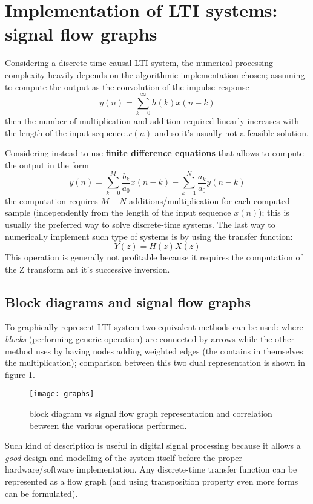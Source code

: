 \section{Implementation of LTI systems: signal flow graphs}
	Considering a discrete-time causal LTI system, the numerical processing complexity heavily depends on the algorithmic implementation chosen; assuming to compute the output as the convolution of the impulse response
	\[  y(n) = \sum_{k=0}^\infty h(k) x(n-k)  \]
	then the number of multiplication and addition required linearly increases with the length of the input sequence $x(n)$ and so it's usually not a feasible solution.
	
	Considering instead to use \textbf{finite difference equations} that allows to compute the output in the form
	\begin{equation}
		y(n) = \sum_{k=0}^M \frac{b_k}{a_0} x(n-k) - \sum_{k=1}^N \frac{a_k}{a_0} y(n-k)
	\end{equation}
	the computation requires $M+N$ additions/multiplication for each computed sample (independently from the length of the input sequence $x(n)$); this is usually the preferred way to solve discrete-time systems. The last way to numerically implement such type of systems is by using the transfer function:
	\[ Y(z) = H(z)X(z) \]
	This operation is generally not profitable because it requires the computation of the Z transform ant it's successive inversion.
	
	\subsection*{Block diagrams and signal flow graphs}
		To graphically represent LTI system two equivalent methods can be used:  where \textit{blocks} (performing generic operation) are connected by arrows while the other method uses  by having nodes adding weighted edges (the contains in themselves the multiplication); comparison between this two dual representation is shown in figure \ref{fig:z:dualrepresentationgraph}.
	
		\begin{figure}[bht]
			\centering \texttt{[image: graphs]}
			\caption{block diagram vs signal flow graph representation and correlation between the various operations performed.} \label{fig:z:dualrepresentationgraph}
		\end{figure}
	
		Such kind of description is useful in digital signal processing because it allows a \textit{good} design and modelling of the system itself before the proper hardware/software implementation. Any discrete-time transfer function can be represented as a flow graph (and using transposition property even more forms can be formulated).
		
